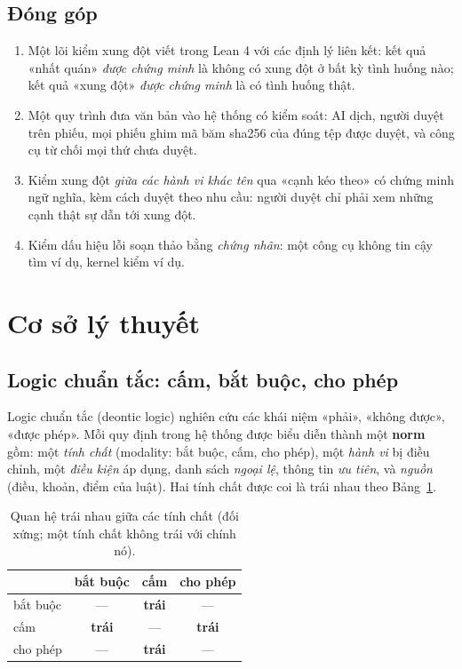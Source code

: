 \documentclass[12pt,a4paper]{article}
\newcommand{\term}[1]{\textbf{#1}}
\begin{document}
\subsection{Đóng góp}

\begin{enumerate}
  \item Một lõi kiểm xung đột viết trong Lean 4 với các định lý liên kết: kết quả «nhất quán» \emph{được chứng minh} là không
    có xung đột ở bất kỳ tình huống nào; kết quả «xung đột» \emph{được chứng minh} là có tình huống thật.
  \item Một quy trình đưa văn bản vào hệ thống có kiểm soát: AI dịch, người duyệt trên phiếu, mọi phiếu ghim mã băm sha256
    của đúng tệp được duyệt, và công cụ từ chối mọi thứ chưa duyệt.
  \item Kiểm xung đột \emph{giữa các hành vi khác tên} qua «cạnh kéo theo» có chứng minh ngữ nghĩa, kèm cách duyệt theo nhu
    cầu: người duyệt chỉ phải xem những cạnh thật sự dẫn tới xung đột.
  \item Kiểm dấu hiệu lỗi soạn thảo bằng \emph{chứng nhân}: một công cụ không tin cậy tìm ví dụ, kernel kiểm ví dụ.
\end{enumerate}

\section{Cơ sở lý thuyết}

\subsection{Logic chuẩn tắc: cấm, bắt buộc, cho phép}

Logic chuẩn tắc (deontic logic) nghiên cứu các khái niệm «phải», «không được», «được phép». Mỗi quy định trong hệ thống được
biểu diễn thành một \term{norm} gồm: một \emph{tính chất} (modality: bắt buộc, cấm, cho phép), một \emph{hành vi} bị điều
chỉnh, một \emph{điều kiện} áp dụng, danh sách \emph{ngoại lệ}, thông tin \emph{ưu tiên}, và \emph{nguồn} (điều, khoản,
điểm của luật). Hai tính chất được coi là trái nhau theo Bảng~\ref{tab:incompat}.

\begin{table}[H]
\centering
\caption{Quan hệ trái nhau giữa các tính chất (đối xứng; một tính chất không trái với chính nó).}
\label{tab:incompat}
\begin{tabular}{lccc}
\toprule
 & bắt buộc & cấm & cho phép\\
\midrule
bắt buộc & --- & \textbf{trái} & ---\\
cấm & \textbf{trái} & --- & \textbf{trái}\\
cho phép & --- & \textbf{trái} & ---\\
\bottomrule
\end{tabular}
\end{table}
\end{document}
